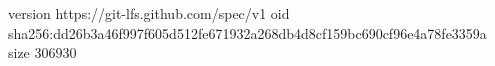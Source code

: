 version https://git-lfs.github.com/spec/v1
oid sha256:dd26b3a46f997f605d512fe671932a268db4d8cf159bc690cf96e4a78fe3359a
size 306930
